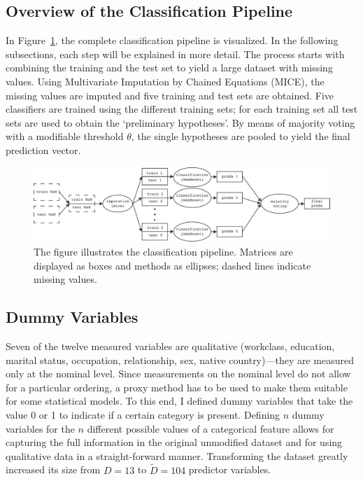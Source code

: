 \documentclass[a4paper,11pt]{article}
\begin{document}
\subsection{Overview of the Classification Pipeline}

In Figure~\ref{fig:pipeline}, the complete classification pipeline is
visualized. In the following subsections, each step will be explained
in more detail. The process starts with combining the training and the
test set to yield a large dataset with missing values. Using
Multivariate Imputation by Chained Equations (MICE), the missing
values are imputed and five training and test sets are obtained. Five
classifiers are trained using the different training sets; for each
training set all test sets are used to obtain the `preliminary
hypotheses'. By means of majority voting with a modifiable threshold
$\theta$, the single hypotheses are pooled to yield the final
prediction vector.

\begin{figure}[h!]
\begin{center}
\includegraphics[width=1\columnwidth]{pipeline}
\caption{{\label{fig:pipeline} The figure illustrates the
    classification pipeline. Matrices are displayed as boxes and
    methods as ellipses; dashed lines indicate missing values.%
  }}
\end{center}
\end{figure}

\subsection{Dummy Variables}

Seven of the twelve measured variables are qualitative (workclass,
education, marital status, occupation, relationship, sex, native
country)---they are measured only at the nominal level. Since
measurements on the nominal level do not allow for a particular
ordering, a proxy method has to be used to make them suitable for
some statistical models. To this end, I defined dummy variables that take
the value 0 or 1 to indicate if a certain category is
present. Defining $n$ dummy variables for the $n$ different possible
values of a categorical feature allows for capturing the full
information in the original unmodified dataset and for using
qualitative data in a straight-forward manner.
Transforming the dataset greatly increased its size from $D = 13$ to
$\tilde{D} = 104$ predictor variables.
\end{document}

